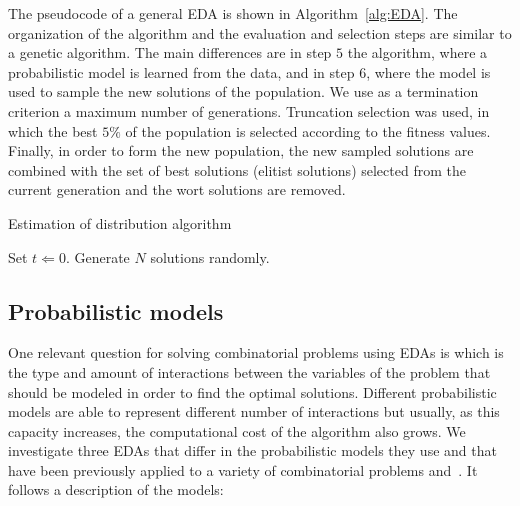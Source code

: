  The pseudocode of a general EDA is shown in Algorithm~\ref{alg:EDA}. The organization of the algorithm and the evaluation and selection steps are similar to a genetic algorithm. The main differences are in step $5$ the algorithm, where a probabilistic model is learned from the data, and in step $6$, where the model is used to sample the new solutions of the population. We use as a termination criterion a maximum number of generations. Truncation selection was used, in which the best $5\%$ of the population is selected according to the fitness values.  Finally, in order to form the new population, the new sampled solutions are combined with the set of best solutions (elitist solutions) selected from the current generation and the wort solutions are removed. 

 

  
\begin{BAlgo}{Estimation of distribution algorithm}
 \label{alg:EDA}
 \item Set $t\Leftarrow 0$. Generate $N$ solutions randomly.
 \item \Do
 \item {}
 \item {}
 \item {}
 \item {}
 \item {}
 \item  {}
\end{BAlgo}





\subsection{Probabilistic models}

 One relevant question for solving combinatorial problems using EDAs is which is the type and amount of interactions between the variables of the problem that should be modeled in order to find the optimal solutions. Different probabilistic models are able to represent different number of interactions but usually, as this capacity increases, the computational cost of the algorithm also grows. We investigate three EDAs that differ in the probabilistic models they use and that have been previously applied to a variety of combinatorial problems and~\cite{Armananzas_et_al:2008,Baluja_and_Davies:1997r,DeBonet_et_al:1996r,Echegoyen_et_al:2012a,Santana_et_al:2008a}. It follows a description of the models:



